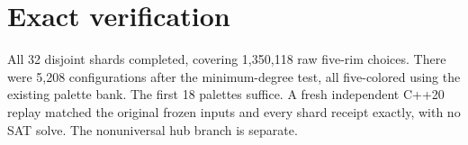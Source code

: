 \documentclass[10pt,letterpaper]{article}
\begin{document}
\section{Exact verification}
All 32 disjoint shards completed, covering 1,350,118 raw five-rim
choices. There were 5,208 configurations after the minimum-degree
test, all five-colored using the existing palette bank. The first
18 palettes suffice. A fresh independent C++20 replay matched the
original frozen inputs and every shard receipt exactly, with no SAT
solve. The nonuniversal hub branch is separate.
\end{document}

